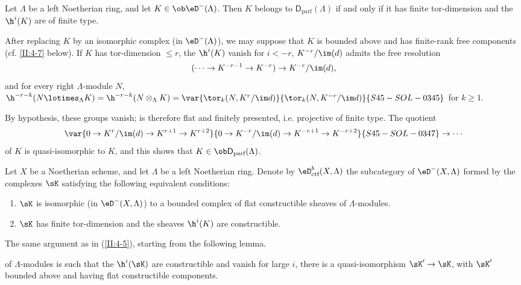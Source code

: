 \begin{lemma}\label{II:4-5-1}
Let $\Lambda$ be a left Noetherian ring, and let
$K\in\ob\eD^-(\Lambda)$. Then $K$ belongs to
$\mathsf{D}_\text{parf}(\Lambda)$ if and only if it has finite tor-dimension
and the $\h^i(K)$ are of finite type.
\end{lemma}

After replacing $K$ by an isomorphic complex (in $\eD^-(\Lambda)$), we may
suppose that $K$ is bounded above and has finite-rank free components (cf.
\ref{II:4-7} below). If $K$ has tor-dimension $\leqslant r$, the
$\h^i(K)$ vanish for $i<-r$, $K^{-r}/\im(d)$ admits the free resolution
\[
  (\cdots \to K^{-r-1} \to K^{-r}) \to K^{-r}/\im(d) \text{,}
\]
and for every right $\Lambda$-module $N$,
$\h^{-r-k}(N\lotimes_\Lambda K) = \h^{-r-k}(N\otimes_\Lambda K)
= \var{\tor_k(N,K^r/\im d)}{\tor_k(N,K^{-r}/\im d)}{S45-SOL-0345}$ for $k\geqslant 1$.

By hypothesis, these groups vanish;  is therefore
flat and finitely presented, i.e. projective of finite type. The quotient
\[
  \var{0 \to K^r/\im(d) \to K^{r+1} \to K^{r+2}}{0 \to K^{-r}/\im(d) \to K^{-r+1} \to K^{-r+2}}{S45-SOL-0347}\to \cdots
\]
of $K$ is quasi-isomorphic to $K$, and this shows that
$K\in\ob\mathsf{D}_\text{parf}(\Lambda)$.






\begin{prop-def_}\label{II:4-6}
Let $X$ be a Noetherian scheme, and let $\Lambda$ be a left Noetherian ring.
Denote by $\eD_\textnormal{ctf}^b(X,\Lambda)$ the subcategory of
$\eD^-(X,\Lambda)$ formed by the complexes $\sK$ satisfying the following
equivalent conditions:
\begin{enumerate}[\indent i)]
  \item $\sK$ is isomorphic (in $\eD^-(X,\Lambda)$) to a bounded complex of
    flat constructible sheaves of $\Lambda$-modules.
  \item $\sK$ has finite tor-dimension and the sheaves $\h^i(K)$ are
    constructible.
\end{enumerate}
\end{prop-def_}

The same argument as in (\ref{II:4-5}), starting from the following lemma.






\begin{lemma_}\label{II:4-7}
 of $\Lambda$-modules is such that the
$\h^i(\sK)$ are constructible and vanish for large $i$, there is a
quasi-isomorphism $\sK'\to \sK$, with $\sK'$ bounded above and having flat
constructible components.
\end{lemma_}

